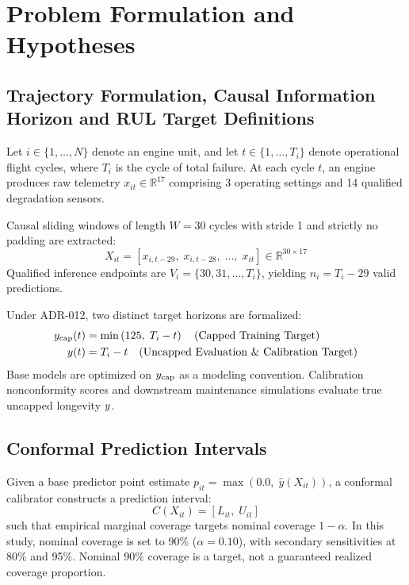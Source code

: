 \section{Problem Formulation and Hypotheses}
\label{sec:problem_formulation}

\subsection{Trajectory Formulation, Causal Information Horizon and RUL Target Definitions}
Let $i \in \{1, \dots, N\}$ denote an engine unit, and let $t \in \{1, \dots, T_i\}$ denote operational flight cycles, where $T_i$ is the cycle of total failure. At each cycle $t$, an engine produces raw telemetry $x_{it} \in \mathbb{R}^{17}$ comprising 3 operating settings and 14 qualified degradation sensors.

Causal sliding windows of length $W = 30$ cycles with stride 1 and strictly no padding are extracted:
\begin{equation}
X_{it} = [x_{i, t-29}, \; x_{i, t-28}, \; \dots, \; x_{it}] \in \mathbb{R}^{30 \times 17}
\end{equation}
Qualified inference endpoints are $V_i = \{30, 31, \dots, T_i\}$, yielding $n_i = T_i - 29$ valid predictions.

Under ADR-012, two distinct target horizons are formalized:
\begin{align}
y_{\text{cap}}(t) &= \min\left(125, \; T_i - t\right) \quad \text{(Capped Training Target)} \\
y(t) &= T_i - t \quad \text{(Uncapped Evaluation \& Calibration Target)}
\end{align}
Base models are optimized on $y_{\text{cap}}$ as a modeling convention. Calibration nonconformity scores and downstream maintenance simulations evaluate true uncapped longevity $y$.

\subsection{Conformal Prediction Intervals}
Given a base predictor point estimate $p_{it} = \max(0.0, \; \hat{y}(X_{it}))$, a conformal calibrator constructs a prediction interval:
\begin{equation}
C(X_{it}) = [L_{it}, \; U_{it}]
\end{equation}
such that empirical marginal coverage targets nominal coverage $1 - \alpha$. In this study, nominal coverage is set to 90\% ($\alpha = 0.10$), with secondary sensitivities at 80\% and 95\%. Nominal 90\% coverage is a target, not a guaranteed realized coverage proportion.


